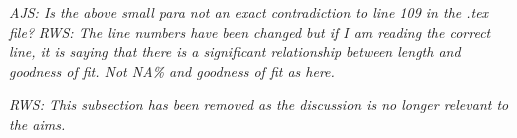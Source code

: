 \documentclass{ametsoc}
\begin{document}



\emph{AJS: Is the above small para not an exact contradiction to line 109 in the .tex file?}
\emph{RWS: The line numbers have been changed but if I am reading the correct line, it is saying that there is a significant relationship between length and goodness of fit. Not NA\% and goodness of fit as here.}

\emph{RWS: This subsection has been removed as the discussion is no longer relevant to the aims.}
\end{document}
